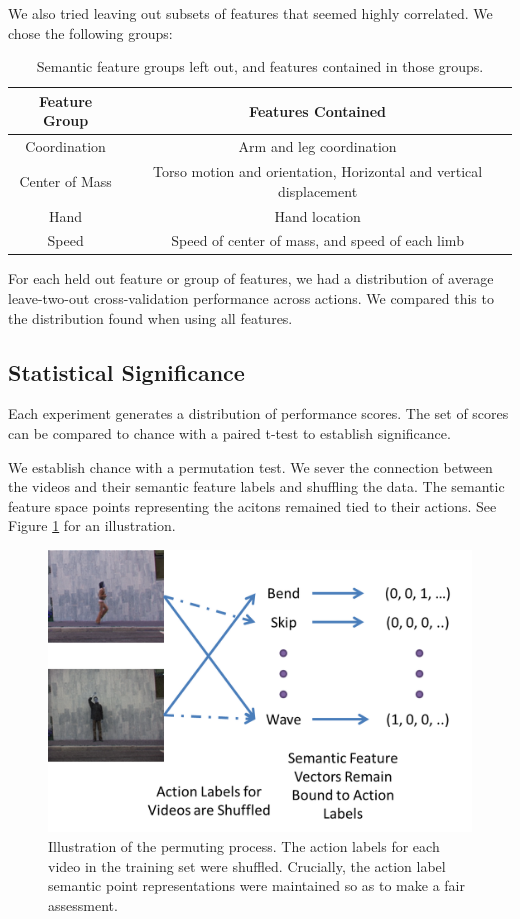 \documentclass{article}
\begin{document}
We also tried leaving out subsets of features that seemed highly correlated. We chose the following groups:

\begin{table}[h]
\centering
\begin{tabular}{c|c}
Feature Group & Features Contained\\ \hline
Coordination & Arm and leg coordination \\ \hline
Center of Mass & Torso motion and orientation, Horizontal and vertical displacement\\ \hline
Hand & Hand location \\ \hline
Speed & Speed of center of mass, and speed of each limb \\
\end{tabular}
\label{featgrp}
\caption{Semantic feature groups left out, and features contained in those groups.}
\end{table}

For each held out feature or group of features, we had a distribution of average leave-two-out cross-validation performance across actions.  We compared this to the distribution found when using all features.

\label{fcomp}

\subsection{Statistical Significance}
Each experiment generates a distribution of performance scores. The set of scores can be compared to chance with a paired t-test to establish significance.

We establish chance with a permutation test. We sever the connection between the videos and their semantic feature labels and shuffling the data. The semantic feature space points representing the acitons remained tied to their actions. See Figure \ref{st} for an illustration.

\begin{figure}[h]
  \centering
  \includegraphics[width=.45\linewidth]{shuffle}
  \caption{Illustration of the permuting process. The action labels for each video in the training set were shuffled. Crucially, the action label semantic point representations were maintained so as to make a fair assessment.}
  \label{st}
\end{figure}
\end{document}
